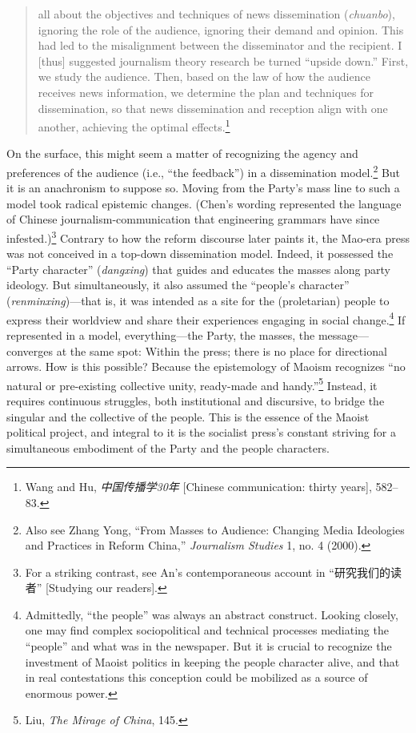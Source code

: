 \documentclass{tufte-handout}
\begin{document}
\begin{CJK*}{UTF8}{gbsn}
\begin{quote}
all about the objectives and techniques of news dissemination
(\emph{chuanbo}), ignoring the role of the audience, ignoring their
demand and opinion. This had led to the misalignment between the
disseminator and the recipient. I {[}thus{]} suggested journalism theory
research be turned ``upside down.'' First, we study the audience. Then,
based on the law of how the audience receives news information, we
determine the plan and techniques for dissemination, so that news
dissemination and reception align with one another, achieving the
optimal effects.\footnote{Wang and Hu, \emph{中国传播学30年} {[}Chinese
  communication: thirty years{]}, 582--83.}
\end{quote}

\noindent On the surface, this might seem a matter of recognizing the agency and
preferences of the audience (i.e., ``the feedback'') in a dissemination
model.\footnote{Also see Zhang Yong, ``From Masses to Audience: Changing
  Media Ideologies and Practices in Reform China,'' \emph{Journalism
  Studies} 1, no. 4 (2000).} But it is an anachronism to suppose so.
Moving from the Party's mass line to such a model took radical epistemic
changes. (Chen's wording represented the language of Chinese
journalism-communication that engineering grammars have since
infested.)\footnote{For a striking contrast, see An's contemporaneous
  account in ``研究我们的读者'' {[}Studying our readers{]}.} Contrary to
how the reform discourse later paints it, the Mao-era press was not
conceived in a top-down dissemination model. Indeed, it possessed the
``Party character'' (\emph{dangxing}) that guides and educates the
masses along party ideology. But simultaneously, it also assumed the
``people's character'' (\emph{renminxing})---that is, it was intended as
a site for the (proletarian) people to express their worldview and share
their experiences engaging in social change.\footnote{Admittedly, ``the
  people'' was always an abstract construct. Looking closely, one may
  find complex sociopolitical and technical processes mediating the
  ``people'' and what was in the newspaper. But it is crucial to
  recognize the investment of Maoist politics in keeping the people
  character alive, and that in real contestations this conception could
  be mobilized as a source of enormous power.} If represented in a
model, everything---the Party, the masses, the message---converges at
the same spot: Within the press; there is no place for directional
arrows. How is this possible? Because the epistemology of Maoism
recognizes ``no natural or pre-existing collective unity, ready-made and
handy.''\footnote{Liu, \emph{The Mirage of China}, 145.} Instead, it
requires continuous struggles, both institutional and discursive, to
bridge the singular and the collective of the people. This is the
essence of the Maoist political project, and integral to it is the
socialist press's constant striving for a simultaneous embodiment of the
Party and the people characters.

\end{CJK*}
\end{document}
